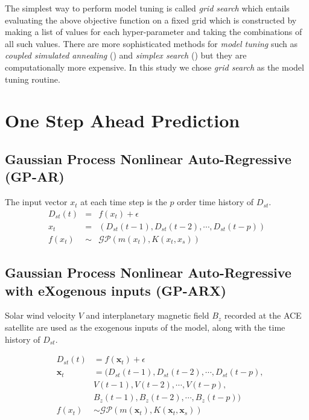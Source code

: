 \documentclass[referee,a4paper,12pt,traditabstract]{swsc}
\begin{document}
\begin{linenumbers}
The simplest way to perform model tuning is called \emph{grid search} which entails evaluating the above objective function on a fixed grid which is constructed by making a list of values for each hyper-parameter and taking the combinations of all such values. There are more sophisticated methods for \emph{model tuning} such as \emph{coupled simulated annealing} (\citet{Xavier-De-Souza2010}) and \emph{simplex search} (\citet{Nelder1965}) but they are computationally more expensive. In this study we chose \emph{grid search} as the model tuning routine. 


\section{One Step Ahead Prediction}


\subsection{Gaussian Process Nonlinear Auto-Regressive (GP-AR)}

The input vector $x_t$ at each time step is the $p$ order time history of $D_{st}$.
  \begin{eqnarray}
    D_{st}(t) & = & f(x_t) + \epsilon\\
    x_t & = & \left(D_{st}(t-1), D_{st}(t-2), \cdots , D_{st}(t-p)\right) \\
    f(x_t) & \sim & \mathcal{GP}(m(x_t), K(x_t,x_s)) \label{eq:DstGP}
\end{eqnarray}

\subsection{Gaussian Process Nonlinear Auto-Regressive with eXogenous inputs (GP-ARX)}

Solar wind velocity $V$ and interplanetary magnetic field $B_z$ recorded at the ACE satellite are used as the exogenous inputs of the model, along with the time history of $D_{st}$.
    
  \begin{eqnarray}
    & D_{st}(t) & = f(\mathbf{x}_t) + \epsilon \\
        & \mathbf{x}_t & = (D_{st}(t-1), D_{st}(t-2), \cdots , D_{st}(t-p), \\
        & \ \ \ \ \ & V(t-1), V(t-2), \cdots, V(t-p),\\
        & \ \ \ \ \ & B_{z}(t-1), B_{z}(t-2), \cdots, B_{z}(t-p))\\
    & f(x_t) & \sim \mathcal{GP}(m(\mathbf{x}_t), K(\mathbf{x}_t,\mathbf{x}_s)) \label{eq:DstGP1}
\end{eqnarray}




\end{linenumbers}
\end{document}
